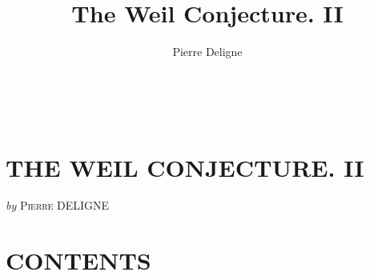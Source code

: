 \documentclass[11pt,leqno]{article}
\title{The Weil Conjecture. II}
\author{Pierre Deligne}
\date{}
\newcommand{\Page}[1]{\ifvmode\noindent\else\unskip\ \fi{\footnotesize\textcolor{gray}{[p.\,#1]}}\ \ignorespaces}
\begin{document}
\maketitle
\Page{137}
\section*{\centering\normalfont THE WEIL CONJECTURE. II}

\begin{center}
\textit{by} \textsc{Pierre} DELIGNE
\end{center}

\section*{\centering\normalfont\normalsize CONTENTS}
\end{document}

